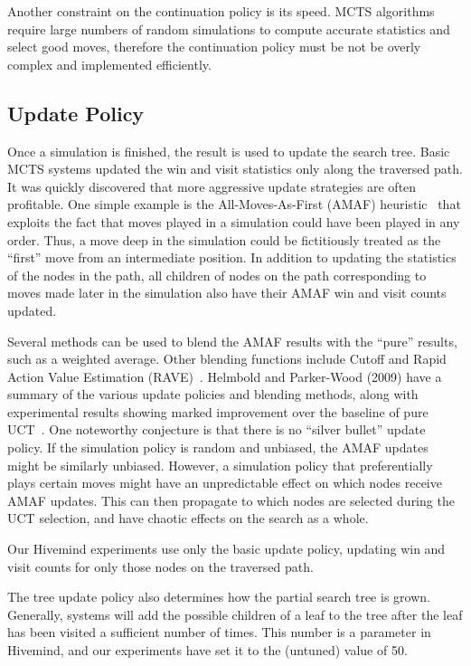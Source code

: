 \documentclass{acm_proc_article-sp}
\begin{document}
Another constraint on the continuation policy is its speed.  
MCTS algorithms require large numbers of random simulations to compute accurate statistics and select good moves, therefore the continuation policy must be not be overly complex and implemented efficiently.

\subsection{Update Policy}
Once a simulation is finished, the result is used to update the search tree.
Basic MCTS systems updated the win and visit statistics only along the traversed path.
It was quickly discovered that more aggressive update strategies are often profitable.
One simple example is the All-Moves-As-First (AMAF) heuristic~\cite{brugmann1993monte}
that exploits the fact that moves played in a simulation could have been played in any order. 
Thus, a move deep in the simulation could be fictitiously treated as the ``first'' move from an intermediate position. 
In addition to updating the statistics of the nodes in the path, all children of nodes on the path corresponding to moves made later
in the simulation also have their AMAF win and visit counts updated. 

Several methods can be used to blend the AMAF results with the ``pure'' results, such as a weighted average.
Other blending functions include Cutoff and Rapid Action Value Estimation (RAVE)~\cite{chaslot2008progressive}. 
Helmbold and Parker-Wood (2009) have a summary of the various update policies and blending methods, along with experimental results showing marked improvement over the baseline of pure UCT~\cite{helmbold2009all}. 
One noteworthy conjecture is that there is no ``silver bullet'' update policy. If the simulation policy is random and unbiased, the AMAF updates might be similarly unbiased. However, a simulation policy that preferentially plays certain moves might have an unpredictable effect on which nodes receive AMAF updates. This can then propagate to which nodes are selected during the UCT selection, and have chaotic effects on the search as a whole. 

Our Hivemind experiments use only the basic update policy, updating win and visit counts for only those nodes on the traversed path.

The tree update policy also determines how the partial search tree is grown.
Generally, systems will add the possible children of a leaf to the tree after the leaf has been visited a sufficient number of times.
This number is a parameter in Hivemind, and our experiments have set it to the (untuned) value of 50.
\end{document}
